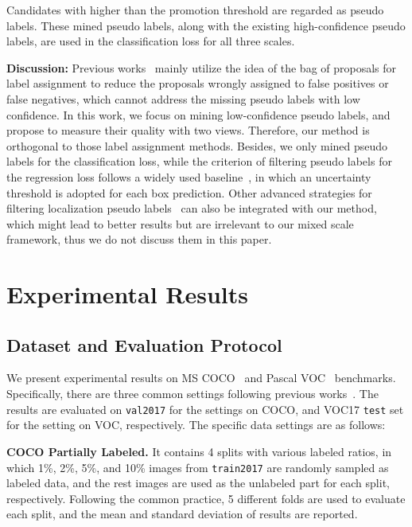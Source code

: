 \documentclass[10pt,twocolumn,letterpaper]{article}
\begin{document}
Candidates with  higher than the promotion threshold  are regarded as pseudo labels. These mined pseudo labels, along with the existing high-confidence pseudo labels, are used in the classification loss for all three scales.



\textbf{Discussion:} Previous works~\cite{pseco, tood, ota} mainly utilize the idea of the bag of proposals for label assignment to reduce the proposals wrongly assigned to false positives or false negatives, which cannot address the missing pseudo labels with low confidence. In this work, we focus on mining low-confidence pseudo labels, and propose to measure their quality with two views. Therefore, our method is orthogonal to those label assignment methods.
Besides, we only mined pseudo labels for the classification loss, while the criterion of filtering pseudo labels for the regression loss follows a widely used baseline~\cite{softTeacher}, in which an uncertainty threshold is adopted for each box prediction. Other advanced strategies for filtering localization pseudo labels~\cite{pseco, VCL} can also be integrated with our method, which might lead to better results but are irrelevant to our mixed scale framework, thus we do not discuss them in this paper.


\section{Experimental Results}
\subsection{Dataset and Evaluation Protocol}

We present experimental results on MS COCO~\cite{coco} and Pascal VOC~\cite{pascalvoc} benchmarks. Specifically, there are three common settings following previous works~\cite{softTeacher, sed}. The results are evaluated on \texttt{val2017} for the settings on COCO, and VOC17 \texttt{test} set for the setting on VOC, respectively.
The specific data settings are as follows:



\noindent \textbf{COCO Partially Labeled.} It contains 4 splits with various labeled ratios, in which 1\%, 2\%, 5\%, and 10\% images from \texttt{train2017} are randomly sampled as labeled data, and the rest images are used as the unlabeled part for each split, respectively. Following the common practice, 5 different folds are used to evaluate each split, and the mean and standard deviation of results are reported.
\end{document}
